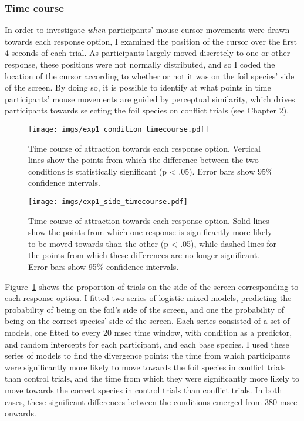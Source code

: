 \subsubsection{Time course}

In order to investigate \emph{when} participants' mouse cursor movements
were drawn towards each response option,
I examined the position of the cursor over the first 4 seconds of each trial.
As participants largely moved discretely to one or other response,
these positions were not normally distributed,
and so I coded the location of the cursor
according to whether or not it was on the foil species' side of the screen.
By doing so, it is possible to identify at what points in time
participants' mouse movements are guided by perceptual similarity,
which drives participants towards selecting the foil species on conflict trials
(see Chapter 2).

\begin{figure}[tp]
  \centering
  \texttt{[image: imgs/exp1\_condition\_timecourse.pdf]}
  \caption[Time course, separately for each response option, in Experiment 1.]{
    Time course of attraction towards each response option.
    Vertical lines show the points from which
    the difference between the two conditions is
    statistically significant (p < .05).
    Error bars show 95\% confidence intervals.
    \label{fig:exp1_condition_timecourse}
  }
\end{figure}

\begin{figure}[bp]
  \centering
  \texttt{[image: imgs/exp1\_side\_timecourse.pdf]}
  \caption[Time course, separately for each condition, in Experiment 1.]{
    Time course of attraction towards each response option.
    Solid lines show the points from which one response
    is significantly more likely to be moved towards than the other (p < .05),
    while dashed lines for the points from which
    these differences are no longer significant.
    Error bars show 95\% confidence intervals.
    \label{fig:exp1_side_timecourse}
  }
\end{figure}

Figure~\ref{fig:exp1_condition_timecourse} shows the proportion of trials
on the side of the screen corresponding to each response option.
I fitted two series of logistic mixed models,
predicting the probability of being on the foil's side of the screen,
and one the probability of being on the correct species' side of the screen.
Each series consisted of a set of models,
one fitted to every 20 msec time window,
with condition as a predictor, 
and random intercepts for each participant, and each base species.
I used these series of models to find the divergence points:
the time from which participants were significantly more likely to move towards
the foil species in conflict trials than control trials,
and the time from which they were significantly more likely to move towards
the correct species in control trials than conflict trials.
In both cases, these significant differences between the conditions
emerged from 380 msec onwards.


